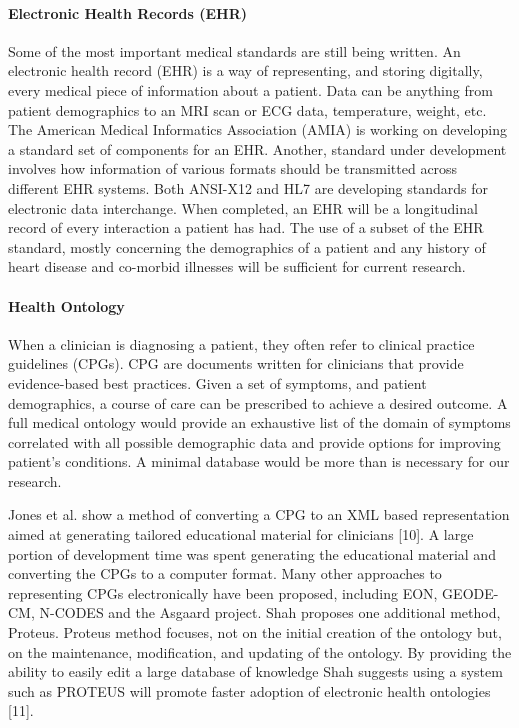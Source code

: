 \paragraph{Electronic Health Records (EHR)}
\label{par:ElectronicHealthRecords}
Some of the most important medical standards are still being written. An electronic health record (EHR) is a way of representing, and storing digitally, every medical piece of information about a patient. Data can be anything from patient demographics to an MRI scan or ECG data, temperature, weight, etc. The American Medical Informatics Association (AMIA) is working on developing a standard set of components for an EHR. Another, standard under development involves how information of various formats should be transmitted across different EHR systems. Both ANSI-X12 and HL7 are developing standards for electronic data interchange. When completed, an EHR will be a longitudinal record of every interaction a patient has had. The use of a subset of the EHR standard, mostly concerning the demographics of a patient and any history of heart disease and co-morbid illnesses will be sufficient for current research.

\paragraph{Health Ontology}
\label{par:HealthOntology}
When a clinician is diagnosing a patient, they often refer to clinical practice guidelines (CPGs). CPG are documents written for clinicians that provide evidence-based best practices. Given a set of symptoms, and patient demographics, a course of care can be prescribed to achieve a desired outcome. A full medical ontology would provide an exhaustive list of the domain of symptoms correlated with all possible demographic data and provide options for improving patient's conditions. A minimal database would be more than is necessary for our research.

Jones et al. show a method of converting a CPG to an XML based representation aimed at generating tailored educational material for clinicians [10]. A large portion of development time was spent generating the educational material and converting the CPGs to a computer format.  Many other approaches to representing CPGs electronically have been proposed, including EON, GEODE-CM, N-CODES and the Asgaard project. Shah proposes one additional method, Proteus. Proteus method focuses, not on the initial creation of the ontology but, on the maintenance, modification, and updating of the ontology.  By providing the ability to easily edit a large database of knowledge Shah suggests using a system such as PROTEUS will promote faster adoption of electronic health ontologies [11].

